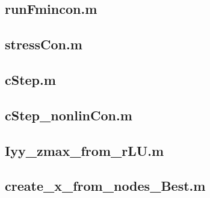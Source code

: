\documentclass[12pt]{article}
\begin{document}
	
	
	
	
	
	
	\iffalse
	

	\subsection{runFmincon.m}
	
	\subsection{stressCon.m}
	
	\newpage
	\subsection{cStep.m}
	
	
	\subsection{cStep\_nonlinCon.m}
	
	
	\subsection{Iyy\_zmax\_from\_rLU.m}
	

	\subsection{create\_x\_from\_nodes\_Best.m}
	
\end{document}
